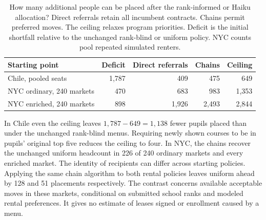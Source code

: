 \begin{table}[ht]\centering\small
\caption{How many additional people can be placed after the rank-informed or Haiku allocation? Direct referrals retain all incumbent contracts. Chains permit preferred moves. The ceiling relaxes program priorities. Deficit is the initial shortfall relative to the unchanged rank-blind or uniform policy. NYC counts pool repeated simulated renters.}\label{tab:design-limits}
\begin{tabular}{@{}lrrrr@{}}\toprule
Starting point & Deficit & Direct referrals & Chains & Ceiling\\\midrule
Chile, pooled seats & 1,787 & 409 & 475 & 649\\
NYC ordinary, 240 markets & 470 & 683 & 983 & 1,353\\
NYC enriched, 240 markets & 898 & 1,926 & 2,493 & 2,844\\\bottomrule
\end{tabular}
\end{table}

In Chile even the ceiling leaves $1,787-649=1,138$ fewer pupils placed than under the unchanged rank-blind menus. Requiring newly shown courses to be in pupils' original top five reduces the ceiling to four. In NYC, the chains recover the unchanged uniform headcount in 226 of 240 ordinary markets and every enriched market. The identity of recipients can differ across starting policies. Applying the same chain algorithm to both rental policies leaves uniform ahead by 128 and 51 placements respectively. The contrast concerns available acceptable moves in these markets, conditional on submitted school ranks and modeled rental preferences. It gives no estimate of leases signed or enrollment caused by a menu.
